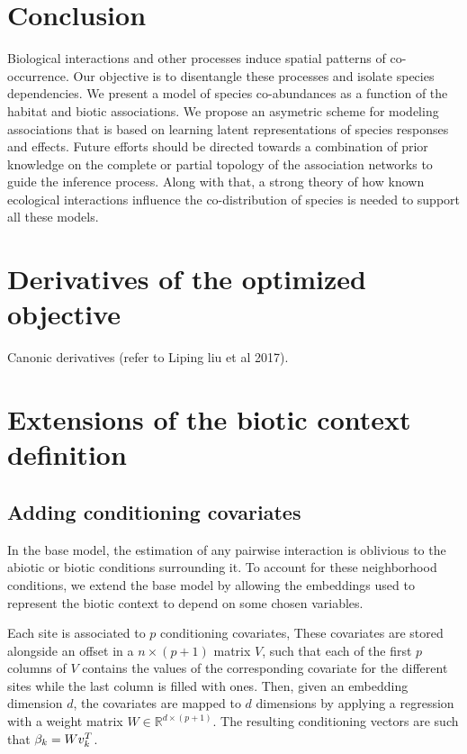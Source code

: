 \documentclass[10pt,a4paper]{article}
\begin{document}
\section{Conclusion}
Biological interactions and other processes induce spatial patterns of co-occurrence. Our objective is to disentangle these processes and isolate species dependencies. We present a model of species co-abundances as a function of the habitat and biotic associations. We propose an asymetric scheme for modeling associations that is based on learning latent representations of species responses and effects. Future efforts should be directed towards a combination of prior knowledge on the complete or partial topology of the association networks to guide the inference process. Along with that, a strong theory of how known ecological interactions influence the co-distribution of species is needed to support all these models.   

\appendix

\section{Derivatives of the optimized objective}
\label{sec:derivatives}
Canonic derivatives (refer to Liping liu et al 2017). 

\section{Extensions of the biotic context definition}
\label{sec:alt-bio}

\subsection{Adding conditioning covariates}
In the base model, the estimation of any pairwise interaction is oblivious to the abiotic or biotic conditions surrounding it. To account for these neighborhood conditions, we extend the base model by allowing the embeddings used to represent the biotic context to depend on some chosen variables.

Each site is associated to $p$ conditioning covariates, These covariates are stored alongside an offset in a $n \times (p+1)$ matrix $V$, such that each of the first $p$ columns of $V$ contains the values of the corresponding covariate for the different sites while the last column is filled with ones. 
Then, given an embedding dimension $d$, the covariates are mapped to $d$ dimensions by applying a regression with a weight matrix $W \in \mathbb{R}^{d \times (p+1)}$. The resulting conditioning vectors are such that $\beta_k = Wv^{T}_{k}$.
\end{document}
